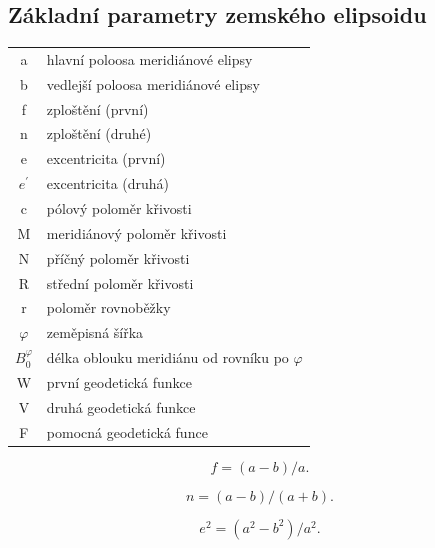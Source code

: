 \documentclass[11pt,a4paper]{article}
\begin{document}

 








\newpage
\begin{appendices}

\section{Základní parametry zemského elipsoidu} \label{appRefEll}

\begin{table}[ht!]
\begin{tabular}{c l}

a & hlavní poloosa meridiánové elipsy \\
b & vedlejší poloosa meridiánové elipsy\\
f & zploštění (první)\\
n & zploštění (druhé)\\
e & excentricita (první)\\
$e^{'}$ & excentricita (druhá)\\
c & pólový poloměr křivosti\\
M & meridiánový poloměr křivosti\\
N & příčný poloměr křivosti\\
R & střední poloměr křivosti\\
r & poloměr rovnoběžky\\
$\varphi$ & zeměpisná šířka\\
$B_{0}^{\varphi}$ & délka oblouku meridiánu od rovníku po $\varphi$ \\
W & první geodetická funkce\\
V & druhá geodetická funkce\\
F & pomocná geodetická funce\\      
\end{tabular}
\end{table}

\begin{equation}
f = (a-b)/a.
\end{equation}

\begin{equation}
n = (a-b)/(a+b).
\end{equation}

\begin{equation}
e^{2} = (a^{2}-b^{2})/a^{2}.
\end{equation}


\end{appendices}
\end{document}
